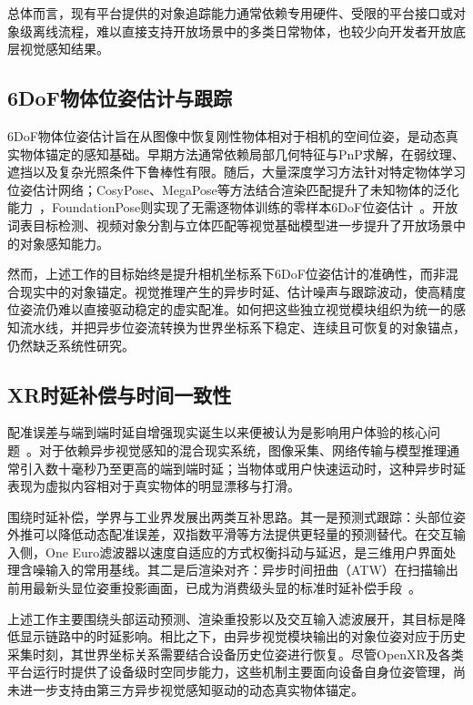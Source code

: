\documentclass[review]{vgtc}
\begin{document}
总体而言，现有平台提供的对象追踪能力通常依赖专用硬件、受限的平台接口或对象级离线流程，难以直接支持开放场景中的多类日常物体，也较少向开发者开放底层视觉感知结果。

\subsection{6DoF物体位姿估计与跟踪}

6DoF物体位姿估计旨在从图像中恢复刚性物体相对于相机的空间位姿，是动态真实物体锚定的感知基础。早期方法通常依赖局部几何特征与PnP求解，在弱纹理、遮挡以及复杂光照条件下鲁棒性有限。随后，大量深度学习方法针对特定物体学习位姿估计网络；CosyPose、MegaPose等方法结合渲染匹配提升了未知物体的泛化能力~\cite{cosypose2020,megapose2022}，FoundationPose则实现了无需逐物体训练的零样本6DoF位姿估计~\cite{foundationpose2023}。开放词表目标检测、视频对象分割与立体匹配等视觉基础模型进一步提升了开放场景中的对象感知能力。

然而，上述工作的目标始终是提升相机坐标系下6DoF位姿估计的准确性，而非混合现实中的对象锚定。视觉推理产生的异步时延、估计噪声与跟踪波动，使高精度位姿流仍难以直接驱动稳定的虚实配准。如何把这些独立视觉模块组织为统一的感知流水线，并把异步位姿流转换为世界坐标系下稳定、连续且可恢复的对象锚点，仍然缺乏系统性研究。

\subsection{XR时延补偿与时间一致性}

配准误差与端到端时延自增强现实诞生以来便被认为是影响用户体验的核心问题~\cite{azuma1994improving,diluca2010latency}。对于依赖异步视觉感知的混合现实系统，图像采集、网络传输与模型推理通常引入数十毫秒乃至更高的端到端时延；当物体或用户快速运动时，这种异步时延表现为虚拟内容相对于真实物体的明显漂移与打滑。

围绕时延补偿，学界与工业界发展出两类互补思路。其一是预测式跟踪：头部位姿外推可以降低动态配准误差，双指数平滑等方法提供更轻量的预测替代。在交互输入侧，One Euro滤波器以速度自适应的方式权衡抖动与延迟，是三维用户界面处理含噪输入的常用基线。其二是后渲染对齐：异步时间扭曲（ATW）在扫描输出前用最新头显位姿重投影画面，已成为消费级头显的标准时延补偿手段~\cite{vanwaveren2016atw}。

上述工作主要围绕头部运动预测、渲染重投影以及交互输入滤波展开，其目标是降低显示链路中的时延影响。相比之下，由异步视觉模块输出的对象位姿对应于历史采集时刻，其世界坐标关系需要结合设备历史位姿进行恢复。尽管OpenXR及各类平台运行时提供了设备级时空同步能力，这些机制主要面向设备自身位姿管理，尚未进一步支持由第三方异步视觉感知驱动的动态真实物体锚定。
\end{document}
